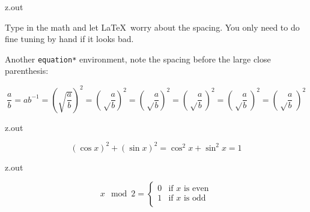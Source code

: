 \begin{VerbatimOut}{z.out}

Type in the math and let \LaTeX\ worry about the spacing.
You only need to do fine tuning by hand if it looks bad.

Another \verb+equation*+ environment,
note the spacing before the large close parenthesis:

\begin{equation*}
  \frac ab
    = ab^{-1}
    = (\sqrt{\frac ab})^2
    = \left( \sqrt\frac ab \right)^2
    = \left( \sqrt\frac ab \!\right)^2
    = \left( \sqrt\frac ab \,\right)^2
    = \left( \sqrt\frac ab \:\right)^2
    = \left( \sqrt\frac ab \;\right)^2
\end{equation*}
\end{VerbatimOut}

\MyIO


\begin{VerbatimOut}{z.out}

\begin{equation*}
  (\cos x)^2 + (\sin x)^2 = \cos^2 x + \sin^2 x = 1
\end{equation*}
\end{VerbatimOut}

\MyIO


\begin{VerbatimOut}{z.out}

\begin{equation}
  x \mod 2 =
  \begin{cases}
    0& \text{if $x$ is even}\\
    1& \text{if $x$ is odd}\\
  \end{cases}
\end{equation}
\end{VerbatimOut}

\MyIO


